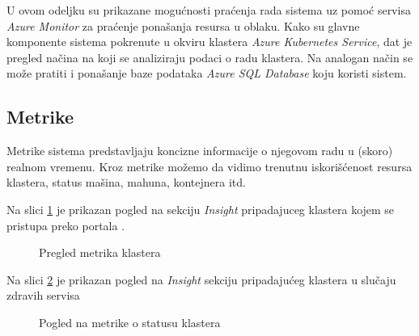 \documentclass[12pt,oneside]{memoir}
\begin{document}
U ovom odeljku su prikazane mogućnosti praćenja rada sistema uz pomoć servisa \emph{Azure Monitor} za praćenje ponašanja resursa u oblaku. Kako su glavne komponente sistema pokrenute u okviru klastera \emph{Azure Kubernetes Service}, dat je pregled načina na koji se analiziraju podaci o radu klastera. Na analogan način se može pratiti i ponašanje baze podataka \emph{Azure SQL Database} koju koristi sistem.

\subsection{Metrike}

Metrike sistema predstavljaju koncizne informacije o njegovom radu u (skoro) realnom vremenu. Kroz metrike možemo da vidimo trenutnu iskorišćenost resursa klastera, status mašina, mahuna, kontejnera itd.

Na slici \ref{fig:aksinsights} je prikazan pogled na sekciju \emph{Insight} pripadajuceg klastera kojem se pristupa preko portala \cite{AzurePortal}.

\begin{figure}[!ht]
  \centering
  \caption{Pregled metrika klastera}
  \label{fig:aksinsights}
\end{figure}

Na slici \ref{fig:clusterunhealthy} je prikazan pogled na \emph{Insight} sekciju pripadajućeg klastera u slučaju zdravih servisa 

\begin{figure}[!ht]
  \centering
  \caption{Pogled na metrike o statusu klastera}
  \label{fig:clusterunhealthy}
\end{figure}
\end{document}
